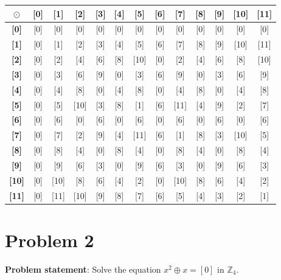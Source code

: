 \documentclass{article} %
\begin{document}
\begin{addmargin}[1em]{0em}
\begin{tabular}{|c|c|c|c|c|c|c|c|c|c|c|c|c|}
\end{tabular}

\begin{tabular}{|c|c|c|c|c|c|c|c|c|c|c|c|c|}
\hline
\textbf{$\odot$}&\textbf{[0]}&\textbf{[1]}&\textbf{[2]}&\textbf{[3]}&\textbf{[4]}&\textbf{[5]}&\textbf{[6]}&\textbf{[7]}&\textbf{[8]}&\textbf{[9]}&\textbf{[10]}&\textbf{[11]}\\ \hline
\textbf{[0]} & [0] & [0] & [0] & [0] & [0] & [0] & [0] & [0] & [0] & [0] & [0] & [0] \\ \hline
\textbf{[1]} & [0] & [1] & [2] & [3] & [4] & [5] & [6] & [7] & [8] & [9] & [10] & [11]\\ \hline
\textbf{[2]} & [0] & [2] & [4] & [6] & [8] & [10] & [0] & [2] & [4] & [6] & [8] & [10]\\ \hline
\textbf{[3]} & [0] & [3] & [6] & [9] & [0] & [3] & [6] & [9] & [0] & [3] & [6] & [9]\\ \hline
\textbf{[4]} & [0] & [4] & [8] & [0] & [4] & [8] & [0] & [4] & [8] & [0] & [4] & [8]\\ \hline
\textbf{[5]} & [0] & [5] & [10] & [3] & [8] & [1] & [6] & [11] & [4] & [9] & [2] & [7]\\ \hline
\textbf{[6]} & [0] & [6] & [0] & [6] & [0] & [6] & [0] & [6] & [0] & [6] & [0] & [6]\\ \hline
\textbf{[7]} & [0] & [7] & [2] & [9] & [4] & [11] & [6] & [1] & [8] & [3] & [10] & [5]\\ \hline
\textbf{[8]} & [0] & [8] & [4] & [0] & [8] & [4] & [0] & [8] & [4] & [0] & [8] & [4]\\ \hline
\textbf{[9]} & [0] & [9] & [6] & [3] & [0] & [9] & [6] & [3] & [0] & [9] & [6] & [3]\\ \hline
\textbf{[10]} & [0] & [10] & [8] & [6] & [4] & [2] & [0] & [10] & [8] & [6] & [4] & [2] \\ \hline
\textbf{[11]} & [0] & [11] & [10] & [9] & [8] & [7] & [6] & [5] & [4] & [3] & [2] & [1]\\ \hline

\end{tabular}
\end{addmargin}    

\newpage

\section*{Problem 2}

\textbf{Problem statement}: Solve the equation $x^2 \oplus x = [0]$ in $\mathbb{Z}_4$.
\\
\end{document}
